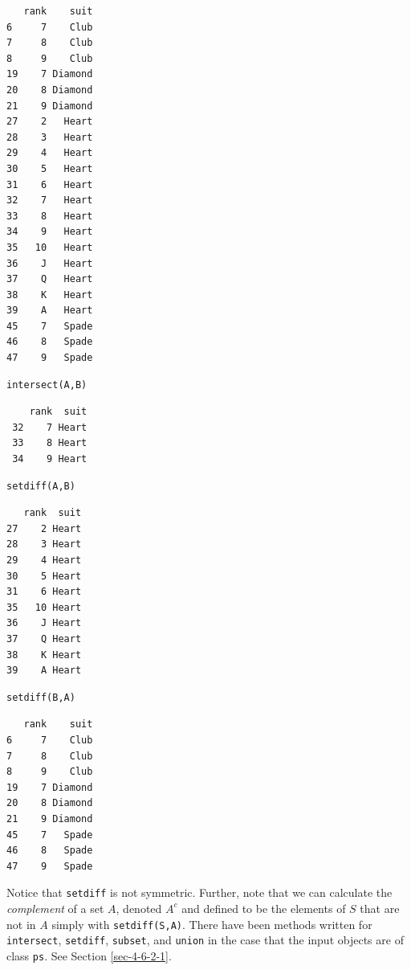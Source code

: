 \documentclass[captions=tableheading]{scrbook}
\begin{document}
\begin{verbatim}
   rank    suit
6     7    Club
7     8    Club
8     9    Club
19    7 Diamond
20    8 Diamond
21    9 Diamond
27    2   Heart
28    3   Heart
29    4   Heart
30    5   Heart
31    6   Heart
32    7   Heart
33    8   Heart
34    9   Heart
35   10   Heart
36    J   Heart
37    Q   Heart
38    K   Heart
39    A   Heart
45    7   Spade
46    8   Spade
47    9   Spade
\end{verbatim}


\lstset{language=R}
\begin{lstlisting}
intersect(A,B)
\end{lstlisting}

\begin{verbatim}
    rank  suit
 32    7 Heart
 33    8 Heart
 34    9 Heart
\end{verbatim}


\lstset{language=R}
\begin{lstlisting}
setdiff(A,B)
\end{lstlisting}


\begin{verbatim}
   rank  suit
27    2 Heart
28    3 Heart
29    4 Heart
30    5 Heart
31    6 Heart
35   10 Heart
36    J Heart
37    Q Heart
38    K Heart
39    A Heart
\end{verbatim}


\lstset{language=R}
\begin{lstlisting}
setdiff(B,A)
\end{lstlisting}


\begin{verbatim}
   rank    suit
6     7    Club
7     8    Club
8     9    Club
19    7 Diamond
20    8 Diamond
21    9 Diamond
45    7   Spade
46    8   Spade
47    9   Spade
\end{verbatim}

Notice that \texttt{setdiff} is not symmetric. Further, note that we can calculate the \emph{complement} of a set \(A\), denoted \(A^{c}\) and defined to be the elements of \(S\) that are not in \(A\) simply with \texttt{setdiff(S,A)}. There have been methods written for \texttt{intersect}, \texttt{setdiff}, \texttt{subset}, and \texttt{union} in the case that the input objects are of class \texttt{ps}. See Section \ref{sec-4-6-2-1}.
\end{document}
